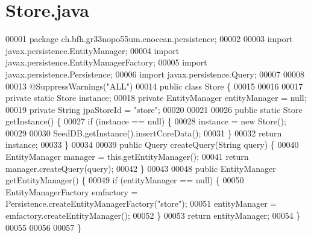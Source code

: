 \section{Store.\+java}
\label{Store_8java_source}

\begin{DoxyCode}
00001 \textcolor{keyword}{package }ch.bfh.gr33nopo55um.enocean.persistence;
00002 
00003 \textcolor{keyword}{import} javax.persistence.EntityManager;
00004 \textcolor{keyword}{import} javax.persistence.EntityManagerFactory;
00005 \textcolor{keyword}{import} javax.persistence.Persistence;
00006 \textcolor{keyword}{import} javax.persistence.Query;
00007 
00008 
00013 @SuppressWarnings(\textcolor{stringliteral}{"ALL"})
00014 public class Store \{
00015 
00016 
00017     \textcolor{keyword}{private} \textcolor{keyword}{static} Store instance;
00018     \textcolor{keyword}{private} EntityManager entityManager = null;
00019     \textcolor{keyword}{private} String jpaStoreId = \textcolor{stringliteral}{"store"};
00020 
00021 
00026     \textcolor{keyword}{public} \textcolor{keyword}{static} Store getInstance() \{
00027         \textcolor{keywordflow}{if} (instance == null) \{
00028             instance = \textcolor{keyword}{new} Store();
00029 
00030             SeedDB.getInstance().insertCoreData();
00031         \}
00032         \textcolor{keywordflow}{return} instance;
00033     \}
00034 
00039     \textcolor{keyword}{public} Query createQuery(String query) \{
00040         EntityManager manager = this.getEntityManager();
00041         \textcolor{keywordflow}{return} manager.createQuery(query);
00042     \}
00043 
00048     \textcolor{keyword}{public} EntityManager getEntityManager() \{
00049         \textcolor{keywordflow}{if} (entityManager == null) \{
00050             EntityManagerFactory emfactory = Persistence.createEntityManagerFactory(\textcolor{stringliteral}{"store"});
00051             entityManager = emfactory.createEntityManager();
00052         \}
00053         \textcolor{keywordflow}{return} entityManager;
00054     \}
00055 
00056 
00057 \}
\end{DoxyCode}
